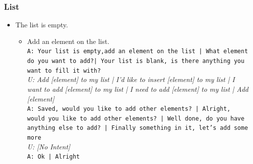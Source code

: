 \subsubsection{List}
\begin{itemize}
	\item The list is empty.\\
	\begin{itemize}
		\item Add an element on the list.\\
		\texttt{A: Your list is empty,add an element on the list | What element do you want to add?| Your list is blank, is there anything you want to fill it with?}\\
		\textit{U: Add [element] to my list | I'd like to insert [element] to my list | I want to add [element] to my list | I need to add [element] to my list | Add [element] }\\
		\texttt{A: Saved, would you like to add other elements? | Alright, would you like to add other elements? | Well done, do you have anything else to add? | Finally something in it, let's add some more}\\
		\textit{U: [No Intent]}\\
		\texttt{A: Ok | Alright}

		


\end{itemize}
\end{itemize}
